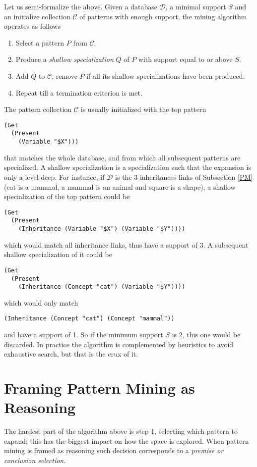 \documentclass[runningheads]{llncs}
\begin{document}
Let us semi-formalize the above. Given a database $\mathcal{D}$, a
minimal support $S$ and an initialize collection $\mathcal{C}$ of
patterns with enough support, the mining algorithm operates as follows
\begin{enumerate}
\item Select a pattern $P$ from $\mathcal{C}$.
\item Produce a \emph{shallow specialization} $Q$ of $P$ with support
  equal to or above $S$.
\item Add $Q$ to $\mathcal{C}$, remove $P$ if all its shallow
  specializations have been produced.
\item Repeat till a termination criterion is met.
\end{enumerate}
The pattern collection $\mathcal{C}$ is usually initialized with the
top pattern
\begin{verbatim}
(Get
  (Present
    (Variable "$X")))
\end{verbatim}
that matches the whole database, and from which all subsequent
patterns are specialized. A shallow specialization is a specialization
such that the expansion is only a level deep. For instance, if
$\mathcal{D}$ is the 3 inheritances links of Subsection \ref{PM} (cat
is a mammal, a mammal is an animal and square is a shape), a shallow
specialization of the top pattern could be
\begin{verbatim}
(Get
  (Present
    (Inheritance (Variable "$X") (Variable "$Y"))))
\end{verbatim}
which would match all inheritance links, thus have a support of 3. A
subsequent shallow specialization of it could be
\begin{verbatim}
(Get
  (Present
    (Inheritance (Concept "cat") (Variable "$Y"))))
\end{verbatim}
which would only match
\begin{verbatim}
(Inheritance (Concept "cat") (Concept "mammal"))
\end{verbatim}
and have a support of 1. So if the minimum support $S$ is 2, this one
would be discarded. In practice the algorithm is complemented by
heuristics to avoid exhaustive search, but that is the crux of it.

\section{Framing Pattern Mining as Reasoning}
\label{FPMR}

The hardest part of the algorithm above is step 1, selecting which
pattern to expand; this has the biggest impact on how the space is
explored. When pattern mining is framed as reasoning such decision
corresponds to a \emph{premise or conclusion selection}.
\end{document}
